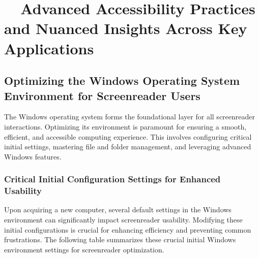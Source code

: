 \section{~~Advanced Accessibility Practices and Nuanced Insights Across Key Applications}

\subsection{Optimizing the Windows Operating System Environment for Screenreader Users}
The Windows operating system forms the foundational layer for all screenreader interactions. Optimizing its environment is paramount for ensuring a smooth, efficient, and accessible computing experience. This involves configuring critical initial settings, mastering file and folder management, and leveraging advanced Windows features.

\subsubsection{Critical Initial Configuration Settings for Enhanced Usability}
Upon acquiring a new computer, several default settings in the Windows environment can significantly impact screenreader usability. Modifying these initial configurations is crucial for enhancing efficiency and preventing common frustrations. The following table summarizes these crucial initial Windows environment settings for screenreader optimization.

